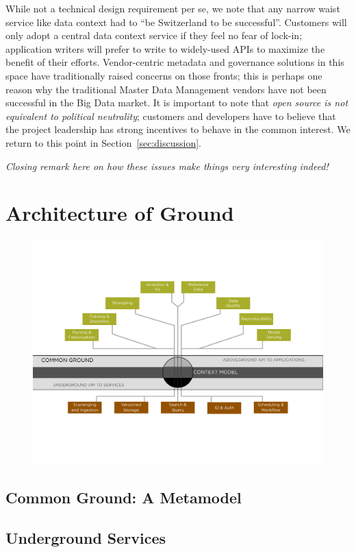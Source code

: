 \documentclass{sig-alternate}
\begin{document}
  While not a technical design requirement per se, we note that any narrow waist service like data context had to ``be Switzerland to be successful''.  Customers will only adopt a central data context service if they feel no fear of lock-in; application writers will prefer to write to widely-used APIs to maximize the benefit of their efforts. Vendor-centric metadata and governance solutions in this space have traditionally raised concerns on those fronts; this is perhaps one reason why the traditional Master Data Management vendors have not been successful in the Big Data market. It is important to note that \emph{open source is not equivalent to political neutrality}; customers and developers have to believe that the project leadership has strong incentives to behave in the common interest. We return to this point in Section~\ref{sec:discussion}.

\vspace{1em}
\emph{Closing remark here on how these issues make things very interesting indeed!}

\section{Architecture of Ground}
\label{sec:arch}
\begin{figure}[th]
\center
\includegraphics[width=0.7\linewidth]{groundarch.pdf}
\end{figure}

\subsection{Common Ground: A Metamodel}
\label{sec:metamodel}
\subsection{Underground Services}
\end{document}
